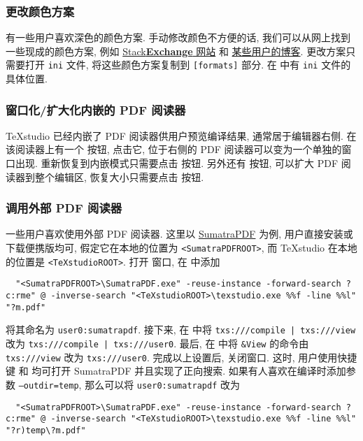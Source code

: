 \subsubsection{更改颜色方案}

有一些用户喜欢深色的颜色方案.
手动修改颜色不方便的话, 我们可以从网上找到一些现成的颜色方案,
例如
\href{https://tex.stackexchange.com/questions/108315/how-can-i-set-a-dark-theme-in-texstudio}{\textsf{Stack\textbf{Exchange}} 网站}%
和%
\href{https://robjhyndman.com/hyndsight/dark-themes-for-writing/}{某些用户的博客}.
更改方案只需要打开 \texttt{ini} 文件,
将这些颜色方案复制到 \texttt{[formats]} 部分.
在 
中有 \texttt{ini} 文件的具体位置.

\subsubsection{窗口化/扩大化内嵌的 PDF 阅读器}

\TeX studio 已经内嵌了 PDF 阅读器供用户预览编译结果,
通常居于编辑器右侧.
在该阅读器上有一个  按钮,
点击它,
位于右侧的 PDF 阅读器可以变为一个单独的窗口出现.
重新恢复到内嵌模式只需要点击  按钮.
另外还有  按钮,
可以扩大 PDF 阅读器到整个编辑区,
恢复大小只需要点击  按钮.

\subsubsection{调用外部 PDF 阅读器}

一些用户喜欢使用外部 PDF 阅读器.
这里以 \href{https://www.sumatrapdfreader.org/free-pdf-reader.html}{SumatraPDF} 为例,
用户直接安装或下载便携版均可,
假定它在本地的位置为 \texttt{<SumatraPDFROOT>},
而 \TeX studio 在本地的位置是 \texttt{<TeXstudioROOT>}.
打开  窗口,
在  中添加
\begin{lstlisting}
  "<SumatraPDFROOT>\SumatraPDF.exe" -reuse-instance -forward-search ?c:rme" @ -inverse-search "<TeXstudioROOT>\texstudio.exe %%f -line %%l" "?m.pdf"
\end{lstlisting}
将其命名为 \texttt{user0:sumatrapdf}.
接下来, 在  中将
\texttt{txs:///compile | txs:///view} 改为
\texttt{txs:///compile | txs:///user0}.
最后, 在  中将 \texttt{\&View} 的命令由
\texttt{txs:///view} 改为 \texttt{txs:///user0}.
完成以上设置后,
关闭窗口.
这时,
用户使用快捷键  和  均可打开 SumatraPDF 并且实现了正向搜索.
如果有人喜欢在编译时添加参数 \texttt{--outdir=temp},
那么可以将 \texttt{user0:sumatrapdf} 改为
\begin{lstlisting}
  "<SumatraPDFROOT>\SumatraPDF.exe" -reuse-instance -forward-search ?c:rme" @ -inverse-search "<TeXstudioROOT>\texstudio.exe %%f -line %%l" "?r)temp\?m.pdf"
\end{lstlisting}

